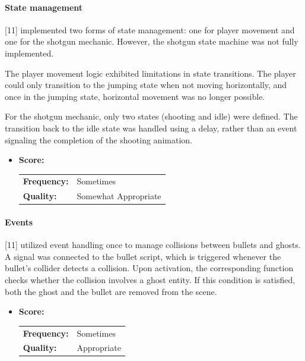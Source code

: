\paragraph{State management}

[11] implemented two forms of state management: one for player movement and one for the shotgun mechanic.
However, the shotgun state machine was not fully implemented.

The player movement logic exhibited limitations in state transitions.
The player could only transition to the jumping state when not moving horizontally, and once in the jumping state, horizontal movement was no longer possible.

For the shotgun mechanic, only two states (shooting and idle) were defined.
The transition back to the idle state was handled using a delay, rather than an event signaling the completion of the shooting animation.

\begin{itemize}
	\item \textbf{Score:}
	      \begin{tabular}{ll}
		      \textbf{Frequency:} & Sometimes            \\
		      \textbf{Quality:}   & Somewhat Appropriate \\
	      \end{tabular}
\end{itemize}

\paragraph{Events}

[11] utilized event handling once to manage collisions between bullets and ghosts.
A signal was connected to the bullet script, which is triggered whenever the bullet’s collider detects a collision.
Upon activation, the corresponding function checks whether the collision involves a ghost entity.
If this condition is satisfied, both the ghost and the bullet are removed from the scene.


\begin{itemize}
	\item \textbf{Score:}
	      \begin{tabular}{ll}
		      \textbf{Frequency:} & Sometimes   \\
		      \textbf{Quality:}   & Appropriate \\
	      \end{tabular}
\end{itemize}


